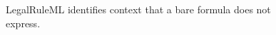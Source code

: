 \begin{figure}[H]
\centering
{}
\caption{LegalRuleML identifies context that a bare formula does not express.}\label{fig:teach-M04-04}
\end{figure}
